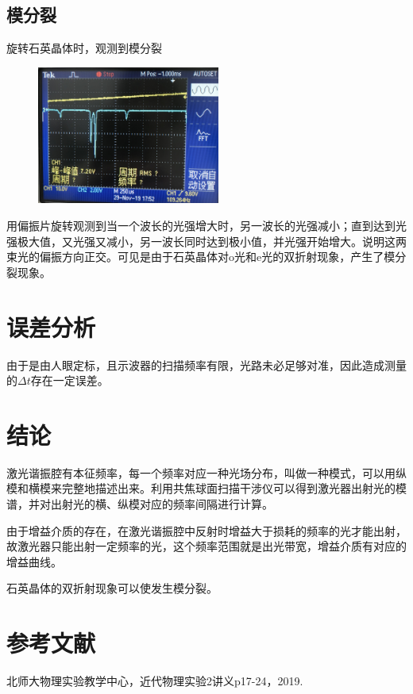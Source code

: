 \documentclass[UTF8]{ctexart}
\begin{document}
\begin{multicols}{2}
\subsection{模分裂}
旋转石英晶体时，观测到模分裂
\begin{figure}[H]
\centering
\includegraphics[width=6cm]{seperate}
\end{figure}

用偏振片旋转观测到当一个波长的光强增大时，另一波长的光强减小；直到达到光强极大值，又光强又减小，另一波长同时达到极小值，并光强开始增大。说明这两束光的偏振方向正交。可见是由于石英晶体对o光和e光的双折射现象，产生了模分裂现象。

\section{误差分析}
由于是由人眼定标，且示波器的扫描频率有限，光路未必足够对准，因此造成测量的$\Delta t$存在一定误差。

\section{结论}
激光谐振腔有本征频率，每一个频率对应一种光场分布，叫做一种模式，可以用纵模和横模来完整地描述出来。利用共焦球面扫描干涉仪可以得到激光器出射光的模谱，并对出射光的横、纵模对应的频率间隔进行计算。

由于增益介质的存在，在激光谐振腔中反射时增益大于损耗的频率的光才能出射，故激光器只能出射一定频率的光，这个频率范围就是出光带宽，增益介质有对应的增益曲线。

石英晶体的双折射现象可以使发生模分裂。

\end{multicols}

\section{参考文献}
\small
\noindent[1]北师大物理实验教学中心，近代物理实验2讲义p17-24，2019.

~\\
~\\
\end{document}
